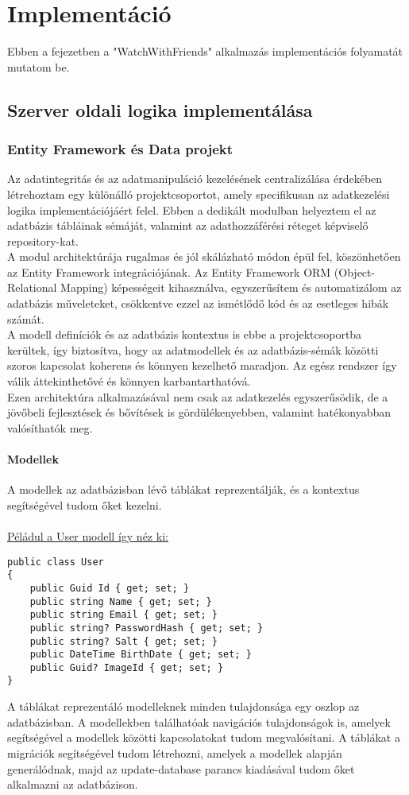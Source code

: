 \chapter{Implement\'aci\'o}\label{chapter:implementation}
Ebben a fejezetben a "WatchWithFriends" alkalmazás implementációs folyamatát mutatom be.
\section*{Szerver oldali logika implementálása}
\subsection*{Entity Framework és Data projekt}
Az adatintegritás és az adatmanipuláció kezelésének centralizálása érdekében létrehoztam egy különálló projektcsoportot, amely specifikusan az adatkezelési logika implementációjáért felel. Ebben a dedikált modulban helyeztem el az adatbázis tábláinak sémáját, valamint az adathozzáférési réteget képviselő repository-kat.
\\
A modul architektúrája rugalmas és jól skálázható módon épül fel, köszönhetően az Entity Framework integrációjának. Az Entity Framework ORM (Object-Relational Mapping) képességeit kihasználva, egyszerűsítem és automatizálom az adatbázis műveleteket, csökkentve ezzel az ismétlődő kód és az esetleges hibák számát.
\\
A modell definíciók és az adatbázis kontextus is ebbe a projektcsoportba kerültek, így biztosítva, hogy az adatmodellek és az adatbázis-sémák közötti szoros kapcsolat koherens és könnyen kezelhető maradjon. Az egész rendszer így válik áttekinthetővé és könnyen karbantarthatóvá.
\\
Ezen architektúra alkalmazásával nem csak az adatkezelés egyszerűsödik, de a jövőbeli fejlesztések és bővítések is gördülékenyebben, valamint hatékonyabban valósíthatók meg.
\subsubsection*{Modellek}
A modellek az adatbázisban lévő táblákat reprezentálják, és a kontextus segítségével tudom őket kezelni.
\\
\\
\underline{Péládul a User modell így néz ki:}
\begin{lstlisting}[language=CSharp,style=CSharpBase,caption={User modell}]
public class User
{
    public Guid Id { get; set; }
    public string Name { get; set; }
    public string Email { get; set; }
    public string? PasswordHash { get; set; }
    public string? Salt { get; set; }
    public DateTime BirthDate { get; set; }
    public Guid? ImageId { get; set; }
}
\end{lstlisting}
\vspace{1em}
A táblákat reprezentáló modelleknek minden tulajdonsága egy oszlop az adatbázisban.
A modellekben találhatóak navigációs tulajdonságok is, amelyek segítségével a modellek közötti kapcsolatokat tudom megvalósítani.
A táblákat a migrációk segítségével tudom létrehozni, amelyek a modellek alapján generálódnak, majd az update-database parancs kiadásával tudom őket alkalmazni az adatbázison.

